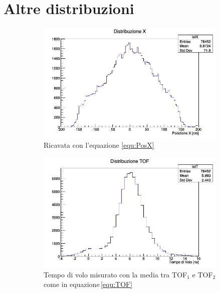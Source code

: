 \documentclass[a4paper,twocolumn]{article}
\begin{document}
\section{Altre distribuzioni}
\label{sec:Distribuzioni}
\begin{figure}[H]
\begin{subfigure}[b]{0.4\textwidth}
\includegraphics[width=\textwidth]{./immagini/TimeOfFlight/DistrX.jpg}
\caption{Ricavata con l'equazione \ref{equ:PosX}}
\label{fig:DistrX}
\end{subfigure}
\hfill
\begin{subfigure}[b]{0.4\textwidth}
\includegraphics[width=\textwidth]{./immagini/TimeOfFlight/DistrTOF.jpg}
\caption{Tempo di volo misurato con la media tra TOF$_1$ e TOF$_2$ come in equazione\,\ref{equ:TOF}}
\label{fig:DistrTof}
\end{subfigure}
\caption{}
\end{figure}
\end{document}
